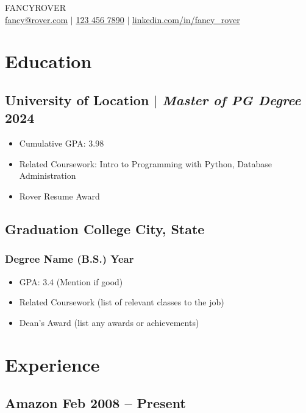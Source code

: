 \documentclass[11pt]{article}
\begin{document}
\begin{center}
    {\fontsize{36}{36}\selectfont\interthin FANCY\interheavy ROVER} \\ \bigskip
    {\color{icnclr}\faEnvelope[regular]} \href{mailto:hi@example.com}{fancy@rover.com} $|$ 
    {\color{icnclr}} \href{tel:1234567890}{123 456 7890} $|$
    {\color{icnclr}\faLinkedinIn} \href{https://www.linkedin.com/}{linkedin.com/in/fancy\_rover}
\end{center}

\section{Education}
\subsection{University of Location $|$ {\normalfont\textit{Master of PG Degree}} \hfill 2024}
\begin{itemize}
    \item Cumulative GPA: 3.98
    \item Related Coursework: Intro to Programming with Python, Database Administration
    \item Rover Resume Award
\end{itemize}

\subsection{Graduation College \hfill City, State}
\subsubsection{Degree Name (B.S.) \hfill Year}
\begin{itemize}
    \item GPA: 3.4 (Mention if good)
    \item Related Coursework (list of relevant classes to the job)
    \item Dean's Award (list any awards or achievements)
\end{itemize}

\section{Experience}
\subsection{Amazon \hfill Feb 2008 -- Present}
\end{document}
